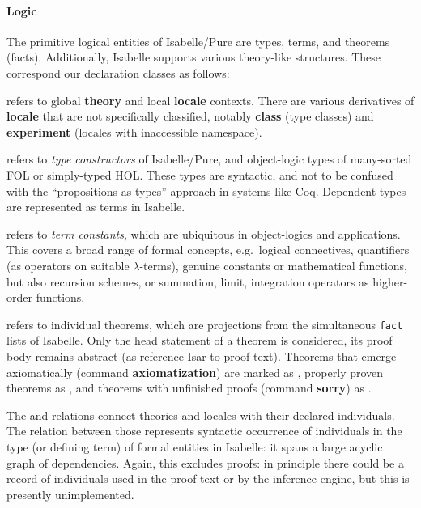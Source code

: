 \paragraph{Logic}
The primitive logical entities of Isabelle/Pure are types, terms, and theorems (facts).
Additionally, Isabelle supports various theory-like structures.
These correspond our declaration classes as follows:
\begin{compactitem}
\item {} refers to global \textbf{theory} and local \textbf{locale} contexts. There are various derivatives of \textbf{locale} that are not specifically classified, notably \textbf{class} (type classes) and \textbf{experiment} (locales with inaccessible namespace).
\item {} refers to \emph{type constructors} of Isabelle/Pure, and object-logic types of many-sorted FOL or simply-typed HOL. These types are syntactic, and not to be confused with the ``propositions-as-types'' approach in systems like Coq. Dependent types are represented as terms in Isabelle.
\item {} refers to \emph{term constants}, which are ubiquitous in object-logics and applications. This covers a broad range of formal concepts, e.g.\ logical connectives, quantifiers (as operators on suitable $\lambda$-terms), genuine constants or mathematical functions, but also recursion schemes, or summation, limit, integration operators as higher-order functions.
\item {} refers to individual theorems, which are projections from the simultaneous \texttt{fact} lists of Isabelle.  Only the head statement of a theorem is considered, its proof body remains abstract (as reference Isar to proof text).
Theorems that emerge axiomatically (command \textbf{axiomatization}) are marked as , properly proven theorems as , and theorems with unfinished proofs (command \textbf{sorry}) as .
\end{compactitem}

\noindent The  and  relations connect theories and locales with their declared individuals.
The  relation between those represents syntactic occurrence of individuals in the type (or defining term) of formal entities in Isabelle: it spans a large acyclic graph of dependencies. Again, this excludes proofs: in principle there could be a record of individuals used in the proof text or by the inference engine, but this is presently unimplemented.

